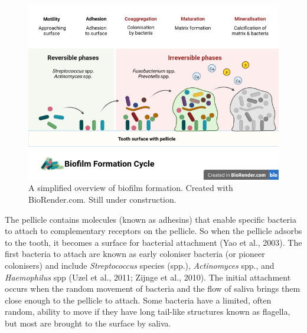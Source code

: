 \documentclass[
  letterpaper,
]{book}
\begin{document}
\begin{figure}

{\centering \includegraphics{./figures/biofilm_formation.png}

}

\caption{\label{fig-biofilm-form}A simplified overview of biofilm
formation. Created with BioRender.com. Still under construction.}

\end{figure}

The pellicle contains molecules (known as adhesins) that enable specific
bacteria to attach to complementary receptors on the pellicle. So when
the pellicle adsorbs to the tooth, it becomes a surface for bacterial
attachment (Yao et al., 2003). The first bacteria to attach are known as
early coloniser bacteria (or pioneer colonisers) and include
\emph{Streptococcus} species (spp.), \emph{Actinomyces} spp., and
\emph{Haemophilus} spp (Uzel et al., 2011; Zijnge et al., 2010). The
initial attachment occurs when the random movement of bacteria and the
flow of saliva brings them close enough to the pellicle to attach. Some
bacteria have a limited, often random, ability to move if they have long
tail-like structures known as flagella, but most are brought to the
surface by saliva.
\end{document}
